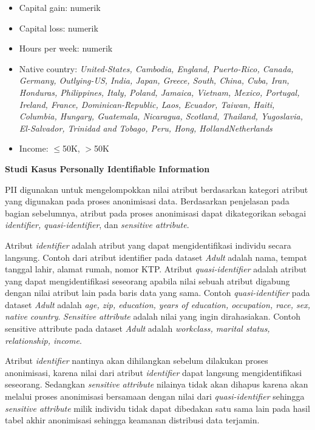 \documentclass[a4paper,twoside]{article}
\begin{document}
\begin{enumerate}
\begin{itemize}
\item Capital gain: numerik

\item Capital loss: numerik

\item Hours per week: numerik

\item Native country: \textit{United-States, Cambodia, England, Puerto-Rico, Canada, Germany, Outlying-US, India, Japan, Greece, South, China, Cuba, Iran, Honduras, Philippines, Italy, Poland, Jamaica, Vietnam, Mexico, Portugal, Ireland, France, Dominican-Republic, Laos, Ecuador, Taiwan, Haiti, Columbia, Hungary, Guatemala, Nicaragua, Scotland, Thailand, Yugoslavia, El-Salvador, Trinidad and Tobago, Peru, Hong, HollandNetherlands}

\item Income: $\leq$50K, $>$50K
\end{itemize}

\textbf{Studi Kasus Personally Identifiable Information}

PII digunakan untuk mengelompokkan nilai atribut berdasarkan kategori atribut yang digunakan pada proses anonimisasi data. Berdasarkan penjelasan pada bagian sebelumnya, atribut pada proses anonimisasi dapat dikategorikan sebagai \textit{identifier, quasi-identifier}, dan \textit{sensitive attribute}. 
\par Atribut \textit{identifier} adalah atribut yang dapat mengidentifikasi individu secara langsung. Contoh dari atribut identifier pada dataset \textit{Adult} adalah nama, tempat tanggal lahir, alamat rumah, nomor KTP. Atribut \textit{quasi-identifier} adalah atribut yang dapat mengidentifikasi seseorang apabila nilai sebuah atribut digabung dengan nilai atribut lain pada baris data yang sama. Contoh \textit{quasi-identifier} pada dataset \textit{Adult} adalah \textit{age, zip, education, years of education, occupation, race, sex, native country}. \textit{Sensitive attribute} adalah nilai yang ingin dirahasiakan. Contoh sensitive attribute pada dataset \textit{Adult} adalah \textit{workclass, marital status, relationship, income}.
\par Atribut \textit{identifier} nantinya akan dihilangkan sebelum dilakukan proses anonimisasi, karena nilai dari atribut \textit{identifier} dapat langsung mengidentifikasi seseorang. Sedangkan \textit{sensitive attribute} nilainya tidak akan dihapus karena akan melalui proses anonimisasi bersamaan dengan nilai dari \textit{quasi-identifier} sehingga \textit{sensitive attribute} milik individu tidak dapat dibedakan satu sama lain pada hasil tabel akhir anonimisasi sehingga keamanan  distribusi data terjamin.


\end{enumerate}
\end{document}
